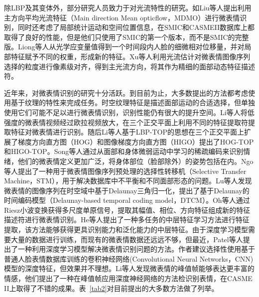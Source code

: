 除LBP及其变体外，部分研究人员致力于对光流特性的研究。如Liu等人提出利用主方向平均光流特征（Main direction Mean opticflow，MDMO）进行微表情识别，同时还考虑了局部统计运动和空间位置信息，在SMIC和CASMEII数据库上都取得了良好的性能，但是他们只使用了SMIC的第一个版本，而不是SMIC的完整版\citep{liu2016mainl}。Liong等人从光学应变量值得到一个时间段内人脸的细微相对位移量，并对局部特征赋予不同的权重，形成新的特征\citep{liong2014subtle}。Xu等人利用光流估计对微表情图像序列选择的粒度进行像素级对齐，得到主光流方向，将其作为精细的面部动态特征描述符\citep{xu2017microexpression}。

近年来，对微表情识别的研究十分活跃。到目前为止，大多数提出的方法都考虑使用基于纹理的特性来完成任务。时空纹理特征是描述面部运动的合适选择，但单独使用它们可能不足以进行微表情识别，识别性能仍有很大的提升空间。Li等人将低强度的微表情视频经过欧拉视频放大，在三个正交平面上利用不同的特征提取符提取特征对微表情进行识别。随后Li等人基于LBP-TOP的思想在三个正交平面上扩展了梯度方向直方图（HOG）和图像梯度方向直方图（HIGO）提出了HOG-TOP和HIGO-TOP。Song等人通过从面部和身体微弱运动中学习的稀疏编码来识别情绪，他们的微表情定义更加广泛，将身体部位（脸部除外）的姿势包括在内\citep{Song2013Learning}。Ngo等人提出了一种用于微表情图像序列预处理的选择性转移机（Selective Transfer Machine，STM），用于解决数据库中不平衡和不同面部形态的问题\citep{le2014spontaneous}。Lu等人发现微表情的图像序列在时空域中基于Delaunay三角归一化，提出了基于Delaunay的时间编码模型（Delaunay-based temporal coding model，DTCM）\citep{lu2014delaunay}。Oh等人通过Riesz小波变换获得多尺度单原信号，提取其幅值、相位、方向特征组成新的特征描述符进行微表情识别\citep{oh2015monogenic}。He等人提出了一种多任务的中层特征学习方法进行特征提取，该方法能够获得更具识别能力和泛化能力的中层特征\citep{he2017multi}。由于深度学习模型需要大量的数据进行训练，而现有的微表情数据还远远不够，但最近，Patel等人提出了一种利用深度学习模型解决微表情识别问题的方法\citep{Patel2016Selective}。作者建议选择性使用基于普通人脸表情数据库训练的卷积神经网络(Convolutional Neural Networks，CNN)模型的深度特征，但效果并不理想。Li等人发现微表情的峰值帧能够表达更丰富的情感，他们提出了一种在峰值帧应用深度神经网络的方法检识别表情，在CASME II上取得了不错的成果\citep{canYan18}。表~\ref{tab2}对目前提出的大多数方法做了列举。

